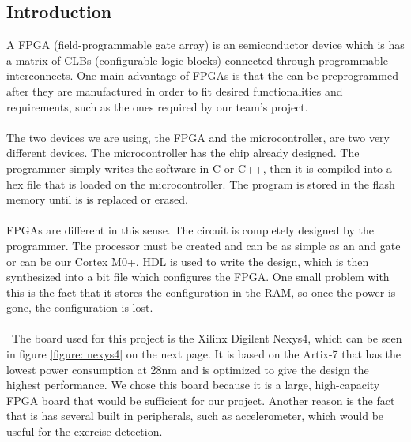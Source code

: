 
\subsection{Introduction}

A FPGA (field-programmable gate array) is an semiconductor device which is has a matrix of CLBs (configurable logic blocks) connected through programmable interconnects. One main advantage of FPGAs is that the can be preprogrammed after they are manufactured in order to fit desired functionalities and requirements, such as the ones required by our team's project.
\\\\
The two devices we are using, the FPGA and the microcontroller, are two very different devices. The microcontroller has the chip already designed. The programmer simply writes the software in C or C++, then it is compiled into a hex file that is loaded on the microcontroller. The program is stored in the flash memory until is is replaced or erased.
\\\\
FPGAs are different in this sense. The circuit is completely designed by the programmer. The processor must be created and can be as simple as an and gate or can be our Cortex M0+. HDL is used to write the design, which is then synthesized into a bit file which configures the FPGA. One small problem with this is the fact that it stores the configuration in the RAM, so once the power is gone, the configuration is lost.
\\\\\
The board used for this project is the Xilinx Digilent Nexys4, which can be seen in figure \ref{figure: nexys4} on the next page. It is based on the Artix-7 that has the lowest power consumption at 28nm and is optimized to give the design the highest performance. We chose this board because it is a large, high-capacity FPGA board that would be sufficient for our project. Another reason is the fact that is has several built in peripherals, such as accelerometer, which would be useful for the exercise detection. 
